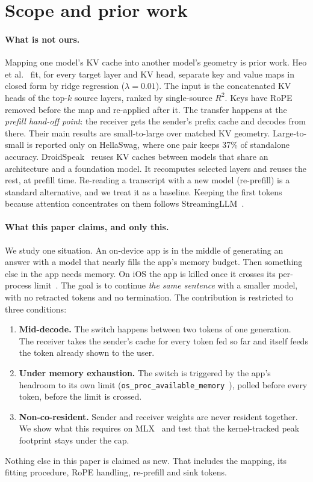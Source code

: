 \section{Scope and prior work}\label{sec:intro}

\paragraph{What is not ours.}
Mapping one model's KV cache into another model's geometry is prior work.
Heo et al.~\citep{heo2026crossmodel} fit, for every target layer and KV head, separate key and value maps in closed form by ridge regression ($\lambda=0.01$).
The input is the concatenated KV heads of the top-$k$ source layers, ranked by single-source $R^2$.
Keys have RoPE~\citep{su2021roformer} removed before the map and re-applied after it.
The transfer happens at the \emph{prefill hand-off point}: the receiver gets the sender's prefix cache and decodes from there.
Their main results are small-to-large over matched KV geometry.
Large-to-small is reported only on HellaSwag, where one pair keeps 37\% of standalone accuracy.
DroidSpeak~\citep{liu2024droidspeak} reuses KV caches between models that share an architecture and a foundation model.
It recomputes selected layers and reuses the rest, at prefill time.
Re-reading a transcript with a new model (re-prefill) is a standard alternative, and we treat it as a baseline.
Keeping the first tokens because attention concentrates on them follows StreamingLLM~\citep{xiao2023streamingllm}.

\paragraph{What this paper claims, and only this.}
We study one situation.
An on-device app is in the middle of generating an answer with a model that nearly fills the app's memory budget.
Then something else in the app needs memory.
On iOS the app is killed once it crosses its per-process limit~\citep{apple_jetsam}.
The goal is to continue \emph{the same sentence} with a smaller model, with no retracted tokens and no termination.
The contribution is restricted to three conditions:
\begin{enumerate}
\item \textbf{Mid-decode.} The switch happens between two tokens of one generation. The receiver takes the sender's cache for every token fed so far and itself feeds the token already shown to the user.
\item \textbf{Under memory exhaustion.} The switch is triggered by the app's headroom to its own limit (\texttt{os\_proc\_available\_memory}~\citep{apple_os_proc_available_memory}), polled before every token, before the limit is crossed.
\item \textbf{Non-co-resident.} Sender and receiver weights are never resident together. We show what this requires on MLX~\citep{mlx2023} and test that the kernel-tracked peak footprint stays under the cap.
\end{enumerate}
Nothing else in this paper is claimed as new.
That includes the mapping, its fitting procedure, RoPE handling, re-prefill and sink tokens.

